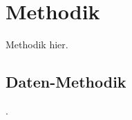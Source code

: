 
\section{Methodik}
\label{sec:daten:methodik}

Methodik hier.

\subsection{Daten-Methodik}
\label{sec:daten_methodik}

.
